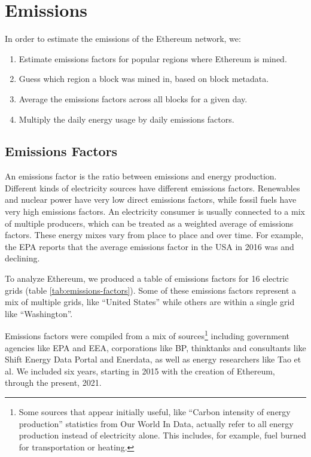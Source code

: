 \section{Emissions}

In order to estimate the emissions of the Ethereum network, we:

\begin{enumerate}
    \item Estimate emissions factors for popular regions where Ethereum is mined.
    \item Guess which region a block was mined in, based on block metadata.
    \item Average the emissions factors across all blocks for a given day.
    \item Multiply the daily energy usage by daily emissions factors.
\end{enumerate}

\subsection{Emissions Factors}

An emissions factor is the ratio between \COtwo{} emissions and energy production. Different kinds of electricity sources have different emissions factors. Renewables and nuclear power have very low direct emissions factors, while fossil fuels have very high emissions factors. An electricity consumer is usually connected to a mix of multiple producers, which can be treated as a weighted average of emissions factors. These energy mixes vary from place to place and over time. For example, the EPA reports that the average emissions factor in the USA in 2016 was  and declining.\cite{us_epa_data_2020}

To analyze Ethereum, we produced a table of emissions factors for 16 electric grids (table \ref{tab:emissions-factors}). Some of these emissions factors represent a mix of multiple grids, like ``United States'' while others are within a single grid like ``Washington''.

Emissions factors were compiled from a mix of sources\footnote{Some sources that appear initially useful, like ``Carbon intensity of energy production''\cite{our_world_in_data_carbon_2019} statistics from Our World In Data, actually refer to all energy production instead of electricity alone. This includes, for example, fuel burned for transportation or heating.} including government agencies like EPA\cite{us_epa_data_2020} and EEA\cite{eea_greenhouse_2021}, corporations like BP\cite{bp_statistical_2021}, thinktanks and consultants like Shift Energy Data Portal\cite{the_shift_project_shift_2020} and Enerdata\cite{enerdata_market_2021}, as well as energy researchers like Tao et al\cite{tao_measuring_2016}. We included six years, starting in 2015 with the creation of Ethereum, through the present, 2021.


